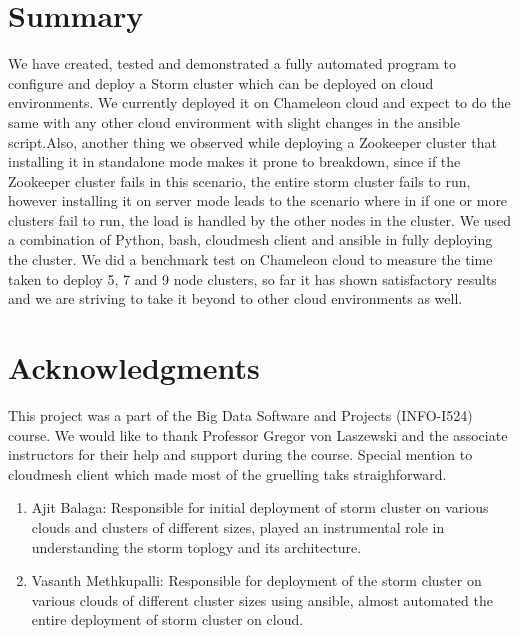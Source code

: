\documentclass[9pt,twocolumn,twoside]{../../styles/osajnl}
\begin{document}
\section{Summary}

We have created, tested and demonstrated a fully automated program to
configure and deploy a Storm cluster which can be deployed on cloud
environments. We currently deployed it on Chameleon cloud and expect
to do the same with any other cloud environment with slight changes in
the ansible script.Also, another thing we observed while deploying a
Zookeeper cluster that installing it in standalone mode makes it prone
to breakdown, since if the Zookeeper cluster fails in this scenario,
the entire storm cluster fails to run, however installing it on server
mode leads to the scenario where in if one or more clusters fail to
run, the load is handled by the other nodes in the cluster. We used a
combination of Python, bash, cloudmesh client and ansible in fully
deploying the cluster. We did a benchmark test on Chameleon cloud to
measure the time taken to deploy 5, 7 and 9 node clusters, so far it
has shown satisfactory results and we are striving to take it beyond
to other cloud environments as well.

\section{Acknowledgments}
This project was a part of the Big Data Software and Projects
(INFO-I524) course. We would like to thank Professor Gregor von
Laszewski and the associate instructors for their help and support
during the course. Special mention to cloudmesh client which made most
of the gruelling taks straighforward.



\begin{enumerate}
\section{Work Breakdown}

\item Ajit Balaga: Responsible for initial deployment of storm cluster on various clouds and clusters of different sizes, played an instrumental role in understanding the storm toplogy and its architecture. 

\item Vasanth Methkupalli: Responsible for deployment of the storm cluster on various clouds of different cluster sizes using ansible, almost automated the entire deployment of storm cluster on cloud.

\end{enumerate}
\end{document}
